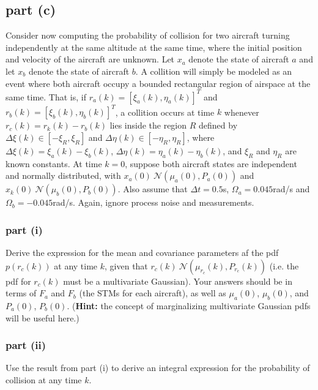 \documentclass[11pt]{article}
\begin{document}
\subsection*{part (c)}
Consider now computing the probability of collision for two aircraft turning independently at the same altitude at the same time, where the initial position and velocity of the aircraft are unknown. Let $x_a$ denote the state of aircraft $a$ and let $x_b$ denote the state of aircraft $b$. A collition will simply be modeled as an event where both aircraft occupy a bounded rectangular region of airspace at the same time. That is, if $r_a(k)=[\xi_a(k),\eta_a(k)]^T$ and $r_b(k)=[\xi_b(k),\eta_b(k)]^T$, a collition occurs at time $k$ whenever $r_c(k) = r_k(k)-r_b(k)$ lies inside the region $R$ defined by $\Delta\xi(k)\in[-\xi_R,\xi_R]$ and $\Delta\eta(k)\in[-\eta_R,\eta_R]$, where $\Delta\xi(k)=\xi_a(k)-\xi_b(k)$, $\Delta\eta(k)=\eta_a(k)-\eta_b(k)$, and $\xi_R$ and $\eta_R$ are known constants. At time $k=0$, suppose both aircraft states are independent and normally distributed, with $x_a(0)~\mathcal{N}(\mu_a(0),P_a(0))$ and $x_k(0)~\mathcal{N}(\mu_b(0),P_b(0))$. Also assume that $\Delta t=0.5$s, $\Omega_a=0.045$rad/s and $\Omega_b=-0.045$rad/s. Again, ignore process noise and measurements.

\subsubsection*{part (i)}
Derive the expression for the mean and covariance parameters af the pdf $p(r_c(k))$ at any time $k$, given that $r_c(k)~\mathcal{N}(\mu_{r_c}(k),P_{r_c}(k))$ (i.e. the pdf for $r_c(k)$ must be a multivariate Gaussian). Your answers should be in terms of $F_a$ and $F_b$ (the STMs for each aircraft), as well as $\mu_a(0)$, $\mu_b(0)$, and $P_a(0)$, $P_b(0)$. (\textbf{Hint:} the concept of marginalizing multivariate Gaussian pdfs will be useful here.)

\subsubsection*{part (ii)}
Use the result from part (i) to derive an integral expression for the probability of collision at any time $k$.
\end{document}
